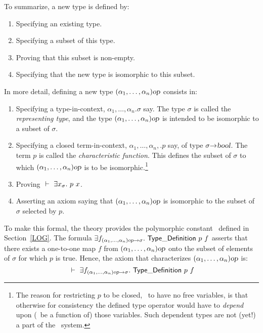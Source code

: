 To summarize, a new type is defined by:
\begin{enumerate}
\item Specifying an existing type.
\item Specifying a subset of this type.
\item Proving that this subset is non-empty.
\item Specifying that the new type is isomorphic to this subset.
\end{enumerate}

\noindent In more detail,
defining a new type $(\alpha_1,\ldots,\alpha_n)\textsl{op}$ consists in:
\begin{enumerate}
\item
Specifying a type-in-context, $\alpha_1,\ldots,\alpha_n.\sigma$ say.
The type
$\sigma$ is called the {\it representing type\/}, and the type
$(\alpha_1,\ldots,\alpha_n)\textsl{op}$ is intended to be isomorphic to a
subset of $\sigma$.

\item
Specifying a closed term-in-context, $\alpha_1,\ldots,\alpha_n,.p$
say, of type $\sigma{\to}\textsl{bool}$. The term $p$ is called the {\it
characteristic function\/}.  This defines the subset of $\sigma$ to which
$(\alpha_1,\ldots,\alpha_n)\textsl{op}$ is to be isomorphic.\footnote{The
reason for restricting $p$ to be closed, \ie\ to have no free
variables, is that otherwise for consistency the defined type operator
would have to {\em depend\/} upon (\ie\ be a function of) those
variables. Such dependent types are not (yet!) a part of the \HOL\ system.}

\item
Proving $\turn \equant{x_{\sigma}} p\ x$.

\item
Asserting an axiom saying that $(\alpha_1,\ldots,\alpha_n)\textsl{op}$ is
isomorphic to the subset of $\sigma$ selected by $p$.

\end{enumerate}

To make this formal, the theory  provides
the polymorphic constant \TyDef\ defined in Section~\ref{LOG}.
The formula
$\equant{f_{(\alpha_1,\ldots,\alpha_n)\ty{op}\fun\sigma}}\TyDef\ p\ f$
asserts that
there exists a one-to-one map $f$ from $(\alpha_1,\ldots,\alpha_n)\textsl{op}$
onto the subset of elements of $\sigma$ for which $p$ is true.
Hence, the axiom that characterizes $(\alpha_1,\ldots,\alpha_n)\textsl{op}$ is:
\[
\ \vdash\  \exists f_{(\alpha_1,\ldots,\alpha_n)\textsl{op}{\to}\sigma}.\ {\sf Type\_Definition}\
p\ f
\]

